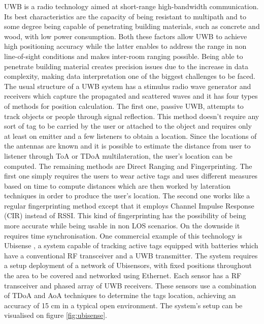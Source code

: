   
\ac{UWB} is a radio technology aimed at short-range high-bandwidth communication. Its best characteristics are the capacity of being resistant to multipath and to some degree being capable of penetrating building materials, such as concrete and wood, with low power consumption. Both these factors allow \ac{UWB} to achieve high positioning accuracy while the latter enables to address the range in non line-of-sight conditions and makes inter-room ranging possible. Being able to penetrate building material creates precision issues due to the increase in data complexity, making data interpretation one of the biggest challenges to be faced. The usual structure of a \ac{UWB} system has a stimulus radio wave generator and receivers which capture the propagated and scattered waves and it has four types of methods for position calculation.  
The first one, passive \ac{UWB}, attempts to track objects or people through signal reflection. This method doesn't require any sort of tag to be carried by the user or attached to the object and requires only at least on emitter and a few listeners to obtain a location. Since the locations of the antennas are known and it is possible to estimate the distance from user to listener through \ac{ToA} or \ac{TDoA} multilateration, the user's location can be computed.  
The remaining methods are Direct Ranging and Fingerprinting. The first one simply requires the users to wear active tags and uses different measures based on time to compute distances which are then worked by lateration techniques in order to produce the user's location. The second one works like a regular fingerprinting method except that it employs Channel Impulse Response (CIR) instead of \ac{RSSI}. This kind of fingerprinting has the possibility of being more accurate while being usable in non \ac{LOS} scenarios. On the downside it requires time synchronisation.  
One commercial example of this technology is Ubisense \cite{ubisense}, a system capable of tracking active tags equipped with batteries which have a conventional RF transceiver and a \ac{UWB} transmitter. The system requires a setup deployment of a network of Ubisensors, with fixed positions throughout the area to be covered and networked using Ethernet. Each sensor has a RF transceiver and  phased array of \ac{UWB} receivers. These sensors use a combination of \ac{TDoA} and \ac{AoA} techniques to determine the tags location, achieving an accuracy of 15 cm in a typical open environment. The system's setup can be visualised on figure \ref{fig:ubisense}.  
  
  
  
